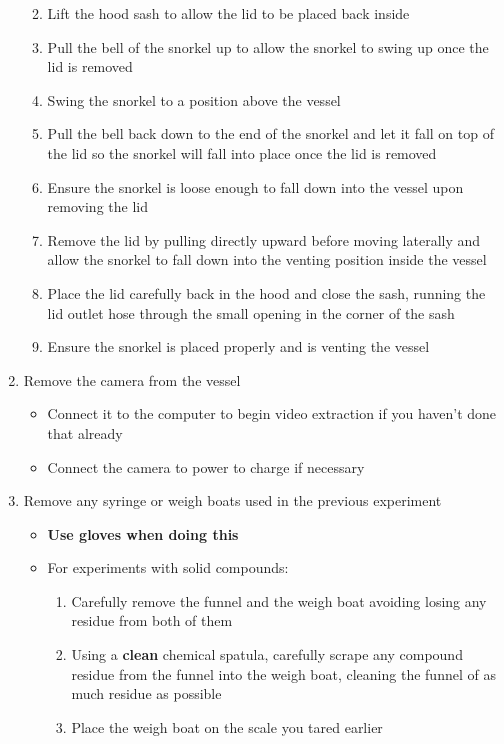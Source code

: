 \begin{enumerate}
  \begin{enumerate}
  \def\labelenumii{\arabic{enumii}.}
  \tightlist
  \item
    Lift the hood sash to allow the lid to be placed back inside
  \item
    Pull the bell of the snorkel up to allow the snorkel to swing up
    once the lid is removed
  \item
    Swing the snorkel to a position above the vessel
  \item
    Pull the bell back down to the end of the snorkel and let it fall on
    top of the lid so the snorkel will fall into place once the lid is
    removed
  \item
    Ensure the snorkel is loose enough to fall down into the vessel upon
    removing the lid
  \item
    Remove the lid by pulling directly upward before moving laterally
    and allow the snorkel to fall down into the venting position inside
    the vessel
  \item
    Place the lid carefully back in the hood and close the sash, running
    the lid outlet hose through the small opening in the corner of the
    sash
  \item
    Ensure the snorkel is placed properly and is venting the vessel
  \end{enumerate}
\item
  Remove the camera from the vessel

  \begin{itemize}
  \tightlist
  \item
    Connect it to the computer to begin video extraction if you haven't
    done that already
  \item
    Connect the camera to power to charge if necessary
  \end{itemize}
\item
  Remove any syringe or weigh boats used in the previous experiment

  \begin{itemize}
  \tightlist
  \item
    \textbf{Use gloves when doing this}
  \item
    For experiments with solid compounds:

    \begin{enumerate}
    \def\labelenumii{\arabic{enumii}.}
    \tightlist
    \item
      Carefully remove the funnel and the weigh boat avoiding losing any
      residue from both of them
    \item
      Using a \textbf{clean} chemical spatula, carefully scrape any
      compound residue from the funnel into the weigh boat, cleaning the
      funnel of as much residue as possible
    \item
      Place the weigh boat on the scale you tared earlier


\end{enumerate}
\end{itemize}
\end{enumerate}

